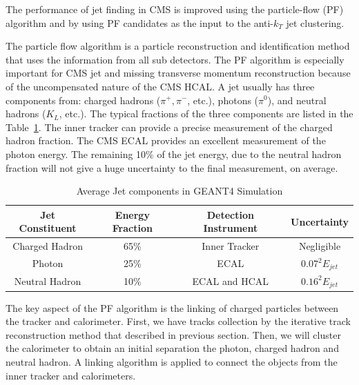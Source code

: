 The performance of jet finding in CMS is improved using the particle-flow (PF) algorithm\cite{CMS-PAS-PFT-09-001} and by using PF candidates as the input to the anti-$k_{T}$ jet clustering. 

The particle flow algorithm is a particle reconstruction and identification method that uses the information from all sub detectors. The PF algorithm is especially important for CMS jet and missing transverse momentum reconstruction because of the uncompensated nature of the CMS HCAL. A jet usually has three components from: charged hadrons ($\pi^{+},\pi^{-}$, etc.), photons ($\pi^{0}$), and neutral hadrons ($K_{L}$, etc.). The typical fractions of the three components are listed in the Table~\ref{tab:c3cmsjetf}. The inner tracker can provide a precise measurement of the charged hadron fraction. The CMS ECAL provides an excellent measurement of the photon energy. The remaining 10\% of the jet energy, due to the neutral hadron fraction will not give a huge uncertainty to the final measurement, on average. 

\begin{table}[htbp]
\fontsize{10 pt}{1.2 em}
\selectfont
\begin{centering}
\caption{\label{tab:c3cmsjetf} Average Jet components in GEANT4 Simulation}
\hspace*{-4ex}
\begin{tabular}{|c|c|c|c|}
\hline
Jet Constituent & Energy Fraction & Detection Instrument & Uncertainty \\
\hline
Charged Hadron  & 65\% & Inner Tracker & Negligible \\
\hline
Photon          & 25\% & ECAL &  $0.07^{2}E_{jet}$ \\
\hline
Neutral Hadron  & 10\% & ECAL and HCAL & $0.16^{2}E_{jet}$ \\
\hline
\end{tabular}
\par\end{centering}
\end{table}

The key aspect of the PF algorithm is the linking of charged particles between the tracker and calorimeter. First, we have tracks collection by the iterative track reconstruction method that described in previous section. Then, we will cluster the calorimeter to obtain an initial separation the photon, charged hadron and neutral hadron. A linking algorithm\cite{CMS-PAS-PFT-09-001} is applied to connect the objects from the inner tracker and calorimeters. 

